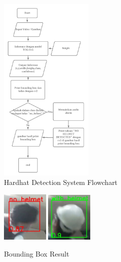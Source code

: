 \begin{figure} [ht]
  \centering
  \includegraphics[width=0.4\textwidth]{gambar/flowchart_sistem.png}

  \caption{Hardhat Detection System Flowchart}
  \label{fig:flowchart_sistem}
\end{figure}

\begin{figure} [ht]
  \centering
  \includegraphics[width=0.2\textwidth]{gambar/utilities/bbox1.png}
  \includegraphics[width=0.2\textwidth]{gambar/utilities/bbox2.png}

  \caption{Bounding Box Result}
  \label{fig:bboxresult}
\end{figure}


